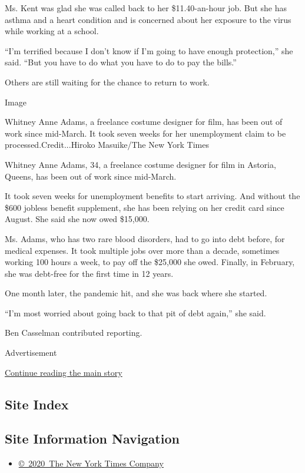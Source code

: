 Ms. Kent was glad she was called back to her \$11.40-an-hour job. But
she has asthma and a heart condition and is concerned about her exposure
to the virus while working at a school.

``I'm terrified because I don't know if I'm going to have enough
protection,'' she said. ``But you have to do what you have to do to pay
the bills.''

Others are still waiting for the chance to return to work.

Image

Whitney Anne Adams, a freelance costume designer for film, has been out
of work since mid-March. It took seven weeks for her unemployment claim
to be processed.Credit...Hiroko Masuike/The New York Times

Whitney Anne Adams, 34, a freelance costume designer for film in
Astoria, Queens, has been out of work since mid-March.

It took seven weeks for unemployment benefits to start arriving. And
without the \$600 jobless benefit supplement, she has been relying on
her credit card since August. She said she now owed \$15,000.

Ms. Adams, who has two rare blood disorders, had to go into debt before,
for medical expenses. It took multiple jobs over more than a decade,
sometimes working 100 hours a week, to pay off the \$25,000 she owed.
Finally, in February, she was debt-free for the first time in 12 years.

One month later, the pandemic hit, and she was back where she started.

``I'm most worried about going back to that pit of debt again,'' she
said.

Ben Casselman contributed reporting.

Advertisement

\protect\hyperlink{after-bottom}{Continue reading the main story}

\hypertarget{site-index}{%
\subsection{Site Index}\label{site-index}}

\hypertarget{site-information-navigation}{%
\subsection{Site Information
Navigation}\label{site-information-navigation}}

\begin{itemize}
\tightlist
\item
  \href{https://help.nytimes3xbfgragh.onion/hc/en-us/articles/115014792127-Copyright-notice}{©~2020~The
  New York Times Company}
\end{itemize}

